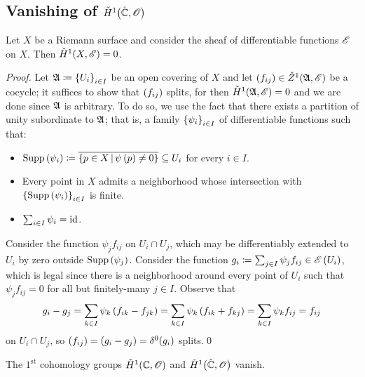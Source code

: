 \documentclass[../Moduli_Spaces_of_Riemann_Surfaces.tex]{subfiles}
\begin{document}
    \subsection{Vanishing of $\check{H}^1\big(\hat{\mathbb{C}},\mathscr{O}\big)$}
    \begin{lemma}\label{CC:lem:vanishing_of_sheaf_differentiable}
        Let $X$ be a Riemann surface and consider the sheaf of differentiable functions $\mathscr{E}$ on $X$. Then $\check{H}^1\!\left(X,\mathscr{E}\right)=0$.
    \end{lemma}
    \begin{proof}
        Let $\mathfrak{A}\coloneqq\left\{U_i\right\}_{i\in I}$ be an open covering of $X$ and let $\left(f_{ij}\right)\in\check{Z}^1\!\left(\mathfrak{A},\mathscr{E}\right)$ be a cocycle; it suffices to show that $\left(f_{ij}\right)$ splits, for then $\check{H}^1\!\left(\mathfrak{A},\mathscr{E}\right)=0$ and we are done since $\mathfrak{A}$ is arbitrary. To do so, we use the fact that there exists a partition of unity subordinate to $\mathfrak{A}$; that is, a family $\left\{\psi_i\right\}_{i\in I}$ of differentiable functions such that:
        \begin{itemize}
            \item $\operatorname{Supp}\left(\psi_i\right)\coloneqq\overline{\left\{p\in X\,\middle\vert\,\psi\left(p\right)\neq0\right\}}\subseteq U_i$ for every $i\in I$.
                \vspace{-0.05in}
            \item Every point in $X$ admits a neighborhood whose intersection with $\left\{\operatorname{Supp}\left(\psi_i\right)\right\}_{i\in I}$ is finite.
                \vspace{-0.05in}
            \item $\sum_{i\in I}\psi_i=\operatorname{id}$.
        \end{itemize}
        Consider the function $\psi_jf_{ij}$ on $U_i\cap U_j$, which may be differentiably extended to $U_i$ by zero outside $\operatorname{Supp}\left(\psi_j\right)$. Consider the function $g_i\coloneqq\sum_{j\in I}\psi_jf_{ij}\in\mathscr{E}\left(U_i\right)$, which is legal since there is a neighborhood around every point of $U_i$ such that $\psi_jf_{ij}=0$ for all but finitely-many $j\in I$. Observe that
        \begin{equation*}
            g_i-g_j=\sum_{k\in I}\psi_k\left(f_{ik}-f_{jk}\right)=\sum_{k\in I}\psi_k\left(f_{ik}+f_{kj}\right)=\sum_{k\in I}\psi_kf_{ij}=f_{ij}
        \end{equation*}
        on $U_i\cap U_j$, so $\left(f_{ij}\right)=\left(g_i-g_j\right)=\delta^0\!\left(g_i\right)$ splits.\qed
    \end{proof}
    \begin{theorem}\label{CC:thm:vanishing_of_H_Riemann_sphere}
        The $1^\textrm{st}$ cohomology groups $\check{H}^1\!\left(\mathbb{C},\mathscr{O}\right)$ and $\check{H}^1\big(\hat{\mathbb{C}},\mathscr{O}\big)$ vanish.
    \end{theorem}
\end{document}
